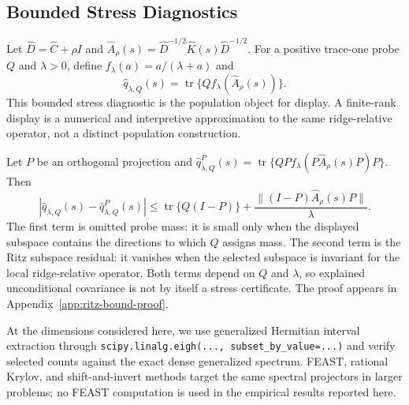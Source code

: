 

\subsection{Bounded Stress Diagnostics}
\label{sec:bounded-stress-diagnostics}

Let $\widehat D=\widehat C+\rho I$ and
$\widehat A_\rho(s)=\widehat D^{-1/2}\widehat K(s)\widehat D^{-1/2}$.
For a positive trace-one probe $Q$ and $\lambda>0$, define
$f_\lambda(a)=a/(\lambda+a)$ and
\[
  \widehat q_{\lambda,Q}(s)
  =
  \operatorname{tr}\{Q f_\lambda(\widehat A_\rho(s))\}.
\]
This bounded stress diagnostic is the population object for display. A
finite-rank display is a numerical and interpretive approximation to the same
ridge-relative operator, not a distinct population construction.

Let $P$ be an orthogonal projection and
$\widehat q^P_{\lambda,Q}(s)=
\operatorname{tr}\{Q P f_\lambda(P\widehat A_\rho(s)P)P\}$. Then
\begin{equation}
\boxed{
\left|
\widehat q_{\lambda,Q}(s)-\widehat q^P_{\lambda,Q}(s)
\right|
\le
\operatorname{tr}\{Q(I-P)\}
+
\frac{\|(I-P)\widehat A_\rho(s)P\|}{\lambda}.
}
\label{eq:ritz-stress-bound}
\end{equation}
The first term is omitted probe mass: it is small only when the displayed
subspace contains the directions to which $Q$ assigns mass. The second term is
the Ritz subspace residual: it vanishes when the selected subspace is invariant
for the local ridge-relative operator. Both terms depend on $Q$ and $\lambda$,
so explained unconditional covariance is not by itself a stress certificate.
The proof appears in Appendix~\ref{app:ritz-bound-proof}.

At the dimensions considered here, we use generalized Hermitian interval
extraction through \texttt{scipy.linalg.eigh(..., subset\_by\_value=...)} and
verify selected counts against the exact dense generalized spectrum. FEAST,
rational Krylov, and shift-and-invert methods target the same spectral
projectors in larger problems; no FEAST computation is used in the empirical
results reported here.


